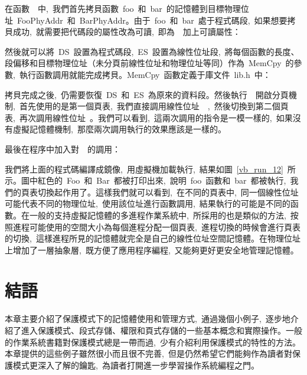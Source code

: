 
在函數~~中,~我們首先拷貝函數~foo~和~bar~的記憶體到目標物理位址~FooPhyAddr~和~BarPhyAddr。由于~foo~和~bar~處于程式碼段,~如果想要拷貝成功,~就需要把代碼段的屬性改為可讀,~即為~~加上可讀屬性：


然後就可以將~DS~設置為程式碼段,~ES~設置為線性位址段,~將每個函數的長度、段偏移和目標物理位址（未分頁前線性位址和物理位址等同）作為~MemCpy~的參數,~執行函數調用就能完成拷貝。MemCpy~函數定義于庫文件~lib.h~中：


拷貝完成之後,~仍需要恢復~DS~和~ES~為原來的資料段。然後執行~~開啟分頁機制,~首先使用的是第一個頁表,~我們直接調用線性位址~~,~然後切換到第二個頁表,~再次調用線性位址~。我們可以看到,~這兩次調用的指令是一模一樣的,~如果沒有虛擬記憶體機制,~那麼兩次調用執行的效果應該是一樣的。

最後在程序中加入對~~的調用：



我們將上面的程式碼編譯成鏡像,~用虛擬機加載執行,~結果如圖~\ref{vb_run_12}~所示。圖中紅色的~Foo~和~Bar~都被打印出來,~說明~foo~函數和~bar~都被執行,~我們的頁表切換起作用了。這樣我們就可以看到,~在不同的頁表中,~同一個線性位址可能代表不同的物理位址,~使用該位址進行函數調用,~結果執行的可能是不同的函數。在一般的支持虛擬記憶體的多進程作業系統中,~所採用的也是類似的方法,~按照進程可能使用的空間大小為每個進程分配一個頁表,~進程切換的時候會進行頁表的切換,~這樣進程所見的記憶體就完全是自己的線性位址空間記憶體。在物理位址上增加了一層抽象層,~既方便了應用程序編程,~又能夠更好更安全地管理記憶體。

\section{結語}

本章主要介紹了保護模式下的記憶體使用和管理方式,~通過幾個小例子,~逐步地介紹了進入保護模式、段式存儲、權限和頁式存儲的一些基本概念和實際操作。一般的作業系統書籍對保護模式總是一帶而過,~少有介紹利用保護模式的特性的方法。本章提供的這些例子雖然很小而且很不完善,~但是仍然希望它們能夠作為讀者對保護模式更深入了解的鑰匙,~為讀者打開進一步學習操作系統編程之門。
